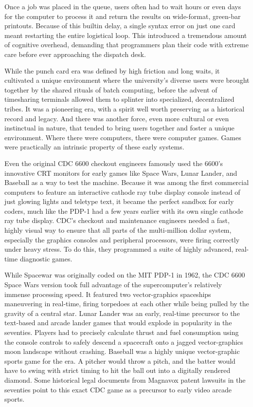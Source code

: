 Once a job was placed in the queue, users often had to wait hours or even days for the computer to process it and return the results on wide-format, green-bar printouts. Because of this builtin delay, a single syntax error on just one card meant restarting the entire logistical loop. This introduced a tremendous amount of cognitive overhead, demanding that programmers plan their code with extreme care before ever approaching the dispatch desk.

While the punch card era was defined by high friction and long waits, it cultivated a unique environment where the university's diverse users were brought together by the shared rituals of batch computing, before the advent of timesharing terminals allowed them to splinter into specialized, decentralized tribes. It was a pioneering era, with a spirit well worth preserving as a historical record and legacy. And there was another force, even more cultural or even instinctual in nature, that tended to bring users together and foster a unique environment. Where there were computers, there were computer games. Games were practically an intrinsic property of these early systems. 

Even the original CDC 6600 checkout engineers famously used the 6600's innovative CRT monitors for early games like Space Wars, Lunar Lander, and Baseball as a way to test the machine. Because it was among the first commercial computers to feature an interactive cathode ray tube display console instead of just glowing lights and teletype text, it became the perfect sandbox for early coders, much like the PDP-1 had a few years earlier with its own single cathode ray tube display. CDC's checkout and maintenance engineers needed a fast, highly visual way to ensure that all parts of the multi-million dollar system, especially the graphics consoles and peripheral processors, were firing correctly under heavy stress. To do this, they programmed a suite of highly advanced, real-time diagnostic games.

While Spacewar was originally coded on the MIT PDP-1 in 1962, the CDC 6600 Space Wars version took full advantage of the supercomputer's relatively immense processing speed. It featured two vector-graphics spaceships maneuvering in real-time, firing torpedoes at each other while being pulled by the gravity of a central star. Lunar Lander was an early, real-time precursor to the text-based and arcade lander games that would explode in popularity in the seventies. Players had to precisely calculate thrust and fuel consumption using the console controls to safely descend a spacecraft onto a jagged vector-graphics moon landscape without crashing. Baseball was a highly unique vector-graphic sports game for the era. A pitcher would throw a pitch, and the batter would have to swing with strict timing to hit the ball out into a digitally rendered diamond. Some historical legal documents from Magnavox patent lawsuits in the seventies point to this exact CDC game as a precursor to early video arcade sports.

